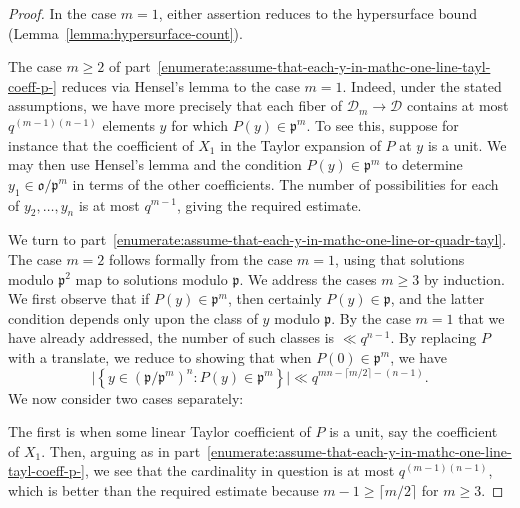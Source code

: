\documentclass[reqno]{amsart}
\theoremstyle{plain} \newtheorem{theorem} {Theorem} \newtheorem{conjecture} {Conjecture} \newtheorem{corollary} [theorem] {Corollary} \newtheorem{proposition} [theorem] {Proposition} \newtheorem{fact} [theorem] {Fact}
\theoremstyle{definition} \newtheorem{definition} [theorem] {Definition}
\theoremstyle{itplain} %
\begin{document}
\begin{proof}
  In the case $m=1$, either assertion reduces to the hypersurface bound (Lemma~\ref{lemma:hypersurface-count}).

  The case $m \geq 2$ of part~\eqref{enumerate:assume-that-each-y-in-mathc-one-line-tayl-coeff-p-} reduces via Hensel's lemma to the case $m = 1$.  Indeed, under the stated assumptions, we have more precisely that each fiber of $\mathcal{D}_m \rightarrow \mathcal{D}$ contains at most $q^{(m-1)(n-1)}$ elements $y$ for which $P(y) \in \mathfrak{p}^m$.  To see this, suppose for instance that the coefficient of $X_1$ in the Taylor expansion of $P$ at $y$ is a unit.  We may then use Hensel's lemma and the condition $P(y) \in \mathfrak{p}^m$ to determine $y_1 \in \mathfrak{o}/\mathfrak{p}^m$ in terms of the other coefficients.  The number of possibilities for each of $y_2,\dotsc,y_n$ is at most $q^{m-1}$, giving the required estimate.

  We turn to part~\eqref{enumerate:assume-that-each-y-in-mathc-one-line-or-quadr-tayl}.  The case $m=2$ follows formally from the case $m=1$, using that solutions modulo $\mathfrak{p}^2$ map to solutions modulo $\mathfrak{p}$.  We address the cases $m \geq 3$ by induction.  We first observe that if $P(y) \in \mathfrak{p}^m$, then certainly $P(y) \in \mathfrak{p}$, and the latter condition depends only upon the class of $y$ modulo $\mathfrak{p}$.  By the case $m=1$ that we have already addressed, the number of such classes is $\ll q^{n-1}$.  By replacing $P$ with a translate, we reduce to showing that when $P(0) \in \mathfrak{p}^m$, we have
  \begin{equation*}
    \lvert \left\{ y \in {(\mathfrak{p}/\mathfrak{p}^m)}^n : P(y) \in \mathfrak{p}^m \right\} \rvert \ll q^{m n  - \lceil m/2 \rceil - (n-1)}.
  \end{equation*}
  We now consider two cases separately:

  The first is when some linear Taylor coefficient of $P$ is a unit, say the coefficient of $X_1$.  Then, arguing as in part~\eqref{enumerate:assume-that-each-y-in-mathc-one-line-tayl-coeff-p-}, we see that the cardinality in question is at most $q^{(m-1) (n-1)}$, which is better than the required estimate because $m - 1 \geq \lceil m/2 \rceil$ for $m \geq 3$.


\end{proof}
\end{document}
